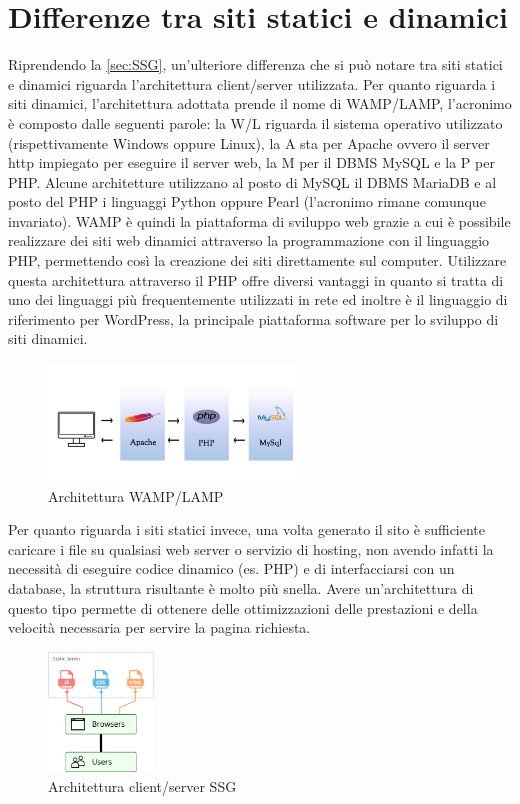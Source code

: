 \documentclass[target=bach,aauheader=]{thud}
\begin{document}
\section{Differenze tra siti statici e dinamici}
Riprendendo la \cref{sec:SSG}, un'ulteriore differenza che si può notare tra siti statici e dinamici riguarda l'architettura client/server utilizzata. \newline
Per quanto riguarda i siti dinamici, l'architettura adottata prende il nome di WAMP/LAMP, l'acronimo è composto dalle seguenti parole: la W/L riguarda il sistema operativo utilizzato (rispettivamente Windows oppure Linux),
la A sta per Apache ovvero il server http impiegato per eseguire il server web, la M per il DBMS MySQL e la P per PHP. Alcune architetture utilizzano al posto di MySQL il DBMS MariaDB e al posto del PHP i linguaggi Python oppure Pearl (l'acronimo rimane comunque invariato). \newline
WAMP è quindi la piattaforma di sviluppo web grazie a cui è possibile realizzare dei siti web dinamici attraverso la programmazione con il linguaggio PHP, permettendo così la creazione dei siti direttamente sul computer. 
Utilizzare questa architettura attraverso il PHP offre diversi vantaggi in quanto si tratta di uno dei linguaggi più frequentemente utilizzati in rete ed inoltre è il linguaggio di riferimento per WordPress, la principale piattaforma software per lo sviluppo di siti dinamici. 
\begin{figure}
    \centering
    \includegraphics[width = 0.6\textwidth]{images/WAMP_LAMP.png}
    \caption{Architettura WAMP/LAMP}
\end{figure}
\newline
Per quanto riguarda i siti statici invece, una volta generato il sito è sufficiente caricare i file su qualsiasi web server o servizio di hosting, non avendo infatti la necessità di eseguire codice dinamico (es. PHP) e di interfacciarsi con un database, la struttura risultante è molto più snella. 
Avere un'architettura di questo tipo permette di ottenere delle ottimizzazioni delle prestazioni e della velocità necessaria per servire la pagina richiesta. 
\begin{figure}[h]
    \centering
    \includegraphics[width = 0.25\textwidth]{images/static.png}
    \caption{Architettura client/server SSG}
\end{figure}
\end{document}
